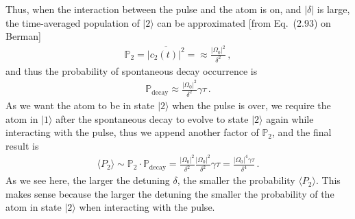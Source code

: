 \documentclass[11pt, oneside]{book}
\theoremstyle{break}
\theoremstyle{break}
\begin{document}
Thus, when the interaction between the pulse and the atom is on, and $|\delta|$ is large, the time-averaged population of $|2\rangle$ can be approximated [from Eq.\ (2.93) on Berman]
\begin{align*}
\mathbb{P}_2 = \overline{|c_2(t)|^2} = \approx \frac{|\Omega_0|^2}{\delta^2}\,,
\end{align*}
and thus the probability of spontaneous decay occurrence is
\begin{align*}
\mathbb{P}_{\text{decay}} \approx  
\frac{|\Omega_0|^2}{\delta^2} \gamma \tau\,.
\end{align*}
As we want the atom to be in state $|2\rangle$ when the pulse is over, we require the atom in $|1\rangle$ after the spontaneous decay to evolve to state $|2\rangle$ again while interacting with the pulse, thus we append another factor of $\mathbb{P}_2$, and the final result is
\begin{align*}
\langle P_2\rangle \sim \mathbb{P}_{2}\cdot \mathbb{P}_{\text{decay}} = \frac{|\Omega_0|^2}{\delta^2}\frac{|\Omega_0|^2}{\delta^2} \gamma \tau = \frac{|\Omega_0|^4\gamma\tau}{\delta^4}\,.
\end{align*}
As we see here, the larger the detuning $\delta$, the smaller the probability $\langle P_2\rangle$. This makes sense because the larger the detuning the smaller the probability of the atom in state $|2\rangle$ when interacting with the pulse. 
\end{document}
